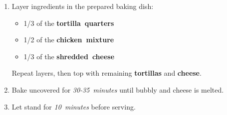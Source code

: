 \documentclass[11pt,letterpaper]{article}
\begin{document}
\begin{enumerate}
    \item Layer ingredients in the prepared baking dish:
    \begin{itemize}
        \item 1/3 of the \textbf{tortilla~quarters}
        \item 1/2 of the \textbf{chicken~mixture}
        \item 1/3 of the \textbf{shredded~cheese}
    \end{itemize}
    Repeat layers, then top with remaining \textbf{tortillas} and \textbf{cheese}.
    
    \item Bake uncovered for \textit{30-35~minutes} until bubbly and cheese is melted.
    
    \item Let stand for \textit{10~minutes} before serving.
\end{enumerate}

\newpage
\end{document}
